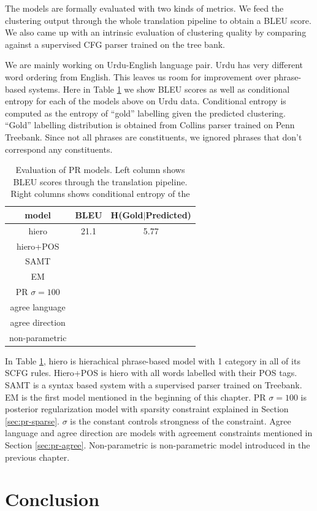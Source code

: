 The models are formally evaluated with two kinds
of metrics. We feed the clustering output
through the whole translation pipeline 
to obtain a BLEU score. We also came up 
with an intrinsic evaluation of clustering quality
by comparing against a supervised CFG parser trained on the
tree bank.

We are mainly working on Urdu-English language pair. 
Urdu has very 
different word ordering from English. 
This leaves us room for improvement over
phrase-based systems.
Here in Table \ref{tab:results} 
we show BLEU scores as well as
conditional entropy for each of the models above
on Urdu data. Conditional entropy is computed
as the entropy of ``gold'' labelling given
the predicted clustering. ``Gold'' labelling
distribution
is obtained from Collins parser
trained on Penn Treebank. Since not
all phrases are constituents, we ignored
phrases that don't correspond any constituents.

\begin{table}[h]
  \centering
  \begin{tabular}{ |*{3}{c|} }
    \hline
    model & BLEU & H(Gold$|$Predicted)\\
        \hline
    hiero & 21.1 & 5.77\\
     hiero+POS &  & \\
     SAMT & & \\
     EM & & \\
     PR $\sigma=100$ & & \\
     agree language & & \\
     agree direction & &\\
     non-parametric & & \\
         \hline
  \end{tabular}
    \caption
  {Evaluation of PR models.
	Left column shows BLEU scores
	through the translation pipeline.
	Right columns shows conditional entropy
	of the 
    }
  \label{tab:results}
\end{table}

In Table \ref{tab:results}, hiero is hierachical phrase-based
model with 1 category in all of its SCFG rules. Hiero+POS
is hiero with all words labelled with their POS tags.
SAMT is a syntax based system with a supervised
parser trained on Treebank. EM is the first model mentioned
in the beginning of this chapter. PR $\sigma=100$ is 
posterior regularization model with sparsity constraint
explained in Section \ref{sec:pr-sparse}.
$\sigma$ is the constant controls strongness of the constraint.
Agree language and agree direction are models with agreement 
constraints mentioned in Section \ref{sec:pr-agree}. Non-parametric
is non-parametric model introduced in the previous chapter.

\section{Conclusion}
